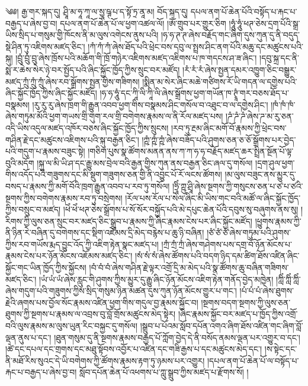 \setcounter{footnote}{0} 
༄༅། རྒྱ་གར་སྐད་དུ། ཤྲཱི་མ་ཧཱ་ཀཱ་ལ་སྱཱ་ཥྚ་པ་ད་སྟོ་ཏྲ་ནཱ་མ། བོད་སྐད་དུ། དཔལ་ནག་པོ་ཆེན་པོའི་བསྟོད་པ་རྐང་པ་བརྒྱད་པ་ཞེས་བྱ་བ། དཔལ་ནག་པོ་ཆེན་པོ་ལ་ཕྱག་འཚལ་ལོ། །ཨོཾ་གྲུབ་པར་གྱུར་ཅིག །ཧཱུཾ་ཧཱུཾ་ཕཊ་ཅེས་དྲག་པོའི་སྒྲ་ཡིས་སྲིད་པ་གསུམ་གྱི་ཁོངས་ནི་མ་ལུས་འགེངས་ནུས་པའི། །ཧ་ཧ་ཊ་ཊ་ཞེས་བརྗོད་གང་ཞིག་དུས་ཀུན་དུ་ནི་བདུད་སྡེ་ཤིན་ཏུ་འཇིགས་མཛད་ཅིང་། །ཀཾ་ཀཾ་ཀཾ་ཞེས་ཐོད་པའི་ཕྲེང་བས་དབུ་ལ་སྤྲས་ཤིང་ནག་པོའི་མཆུ་དང་མཚུངས་པའི་སྐུ། །བྲུཾ་བྲུཾ་བྲུ་ཞེས་ཁྲོས་པའི་མཆོག་གི་ཁྲོ་གཉེར་འཇིགས་མཛད་འཇིགས་པ་ཁ་གདངས་ཤ་ཟ་ཞིང་། །དབུ་སྐྲ་དང་ནི་སྨ་ར་ཆེས་སེར་ཉེ་བར་སྤྱོད་པའི་ཞིང་སྐྱོང་ཁྱོད་ཀྱིས་སྲུང་བར་མཛོད། །རཾ་རཾ་རཾ་ཞེས་སྤྱན་དམར་འཁྱུག་ཅིང་བསྒྱུར་མཛད་ཀྲུཾ་ཀྲུཾ་ཀྲུཾ་ཞེས་རབ་སྒྲོགས་སྤྱན་གྱིས་གཟིགས། །སྨིན་མ་སེར་ཞིང་མཆེ་གཙིགས་རོ་ཡི་གདན་ལ་དགྱེས་པའི་ཞིང་སྐྱོང་ཁྱོད་ཀྱིས་ཞིང་སྐྱོང་མཛོད། །ཧ་ཧ་ཧཱུཾ་དང་ཀཱི་ལི་ཀཱི་ལི་ཞེས་སྒྲོགས་ཕྱག་གཡོན་ཁ་ཊྭཱཾ་གར་བཅས་ཐོད་པ་བསྣམས། །རུ་རུ་རུ་ཞེས་ཁྲག་གི་རྒྱུན་འབབ་ཕྱག་གིས་བསྣམས་ཤིང་གསོལ་བ་འཐུང་བ་ལ་དགྱེས་ཤིང་། །ཁཾ་ཁཾ་ཁཾ་ཞེས་གཏུམ་མོའི་ཕྱག་གཡས་གྲི་གུག་རལ་གྲི་བགེགས་རྣམས་ལ་ནི་རོལ་མཛད་པས། །ཌཾ་ཌཾ་ཌཾ་ཞེས་ཌ་མ་རུ་ཅན་འདི་ཡིས་འདུལ་མཛད་འཁོར་བཅས་ཞིང་སྐྱོང་ཁྱོད་ཀྱིས་སྲུངས། །རབ་ཏུ་རྔམ་ཞིང་མགོ་བོ་རྣམས་ཀྱི་ཕྲེང་བས་གཤིན་རྗེ་དང་མཚུངས་འཇིགས་པའི་སྐུ་བརྒྱན་ཅིང་། །ཀྵཾ་ཀྵཾ་ཀྵཾ་ཞེས་བཟོད་པའི་ཤུགས་ཅན་ཅ་ཅོ་སྒྲོགས་པར་བྱེད་པའི་གདུག་པ་རྣམས་བཟུང་སྟེ། །གཅིག་པུས་སྣ་ཚོགས་མནན་ནས་ཀ་ཀ་ཧ་ཧ་བརྗོད་མཛད་ཆར་སྤྲིན་སྔོན་པོ་ལྟ་བུའི་མདོག །སྐུ་ལ་མི་ཡི་ཤ་དང་རྒྱུ་མས་བྲེལ་བའི་རྒྱན་གྱིས་ཀུན་ནས་བརྒྱན་ཅིང་ཞལ་དུ་གསོལ། །དྲག་ཤུལ་ཕྱག་གིས་འདོད་པའི་གཟུགས་དང་མི་སྡུག་གཟུགས་ཅན་གྱི་ནི་འབྱུང་པོ་རོ་ལངས་ཚོགས། །མ་ལུས་བཟུང་ནས་མྱུར་དུ་བསད་པ་རྣམས་ཀྱི་མགོ་བོའི་ཁྲག་རྒྱུན་འབབ་པ་རབ་ཏུ་གསོལ། །ཧྲཱིཾ་ཀྵུ་ཤྲཱི་ཞེས་སྔགས་ཀྱི་གསུངས་ཅན་པ་ཙ་པ་ཙའི་སྔགས་ཀྱིས་བགེགས་རྣམས་རབ་ཏུ་བསྲེགས། །རོལ་པས་རོལ་པ་སེལ་ཞིང་མི་ཡིས་གང་བའི་མཚོ་ལ་ཞིང་སྐྱོང་ཁྱོད་ཀྱིས་བསྲུང་བ་མཛད། །ཕེཾ་ཕེཾ་ཕཊ་ཅེས་སྒྲོགས་པ་སོ་སོར་བསྐྱོད་པའི་མེ་དཔུང་ཆེན་པོའི་དབུས་སུ་བཞུགས་ནས་སུ། །རིགས་ཀྱི་ལུས་ཅན་སྲུང་བར་མཛད་ཅིང་སྒྲུབ་པ་རྣམས་ཀྱི་ཞིང་རྣམས་ངེས་པར་ཞིང་སྐྱོང་མཛོད། །ཕྱུགས་རྣམས་ཀྱི་ནི་ཉིན་རེ་བཞིན་དུ་བགེགས་དང་སྡིག་འཇོམས་དྲི་མེད་བརྙེས་པ་ཆུ་ཉི་བཞིན། །ཙཾ་ཙཾ་ཙཾ་ཞེས་གཏུམ་པའི་ཤུགས་ཀྱིས་རབ་གཡོས་རྨད་བྱུང་འོད་ཀྱི་འཇིག་རྟེན་སྣང་མཛད་པ། །ཀྲཾ་ཀྲཾ་ཀྲཾ་ཞེས་གཤེགས་པས་དགྲ་བོ་ཉོན་མོངས་པ་རྣམས་ངེས་པར་ཉོན་མོངས་འཇོམས་མཛད་ཅིང་། །སཾ་སཾ་སཾ་ཞེས་ཚོགས་པའི་བདག་ཉིད་དམ་ཚིག་ཐོས་འཛིན་ཞིང་སྐྱོང་གང་ཡིན་ཁྱོད་ཀྱིས་སྐྱོངས། །བཾ་བཾ་བཾ་ཞེས་གཤིན་རྗེ་ལྟར་འགྲོ་དྲི་མ་མེད་པའི་སྣ་ཚོགས་ཆུ་བཞིན་གཟིགས་མཛད་ཅིང་། །ཡཾ་ཡཾ་ཡཾ་ཞེས་རླུང་གི་ཤུགས་ཀྱིས་མྱུར་དུ་རྒྱུ་ཞིང་ཉོན་མོངས་འཇིག་རྟེན་གནོད་བྱེད་མཁྱེན། །ཀླིཾ་ཀླིཾ་ཀླིཾ་ཞེས་གདུག་པའི་གཟུགས་ཀྱིས་སྲིད་གསུམ་ཉིན་མཚན་དུས་ཀུན་ཉོན་མོངས་གྱུར་པ་གང་། །པཾ་པཾ་པཾ་ཞེས་ཐུགས་རྗེའི་ཞགས་པས་བྱོལ་སོང་རྣམས་འཛིན་ཕྱག་གིས་གདུལ་བྱ་རྣམས་སྐྱོང་བ། །སྔགས་བདག་སྔགས་ཀྱི་ལུས་ཅན་ཐུགས་ཀྱི་སྔགས་པ་རྣམས་ལ་འབྲས་བུ་བློ་གྲོས་མཚུངས་མེད་སྟེར། །ཞིང་རྣམས་སྐྱོང་བར་མཛད་པ་ཁྱོད་ཀྱིས་འགྲོ་བའི་ལུས་རྣམས་མ་ལུས་ཡུན་རིང་བསྐྱང་དུ་གསོལ། །སྒྲུབ་པ་པོའམ་སློབ་དཔོན་འགའ་ཞིག་ཐོས་འཛིན་གང་ཞིག་བློ་ལྡན་ནུས་པ་དང་། །ཐུན་གསུམ་དུ་ནི་སྔགས་རྣམས་བརྒྱད་པོ་ཀློག་བྱེད་དེ་ནི་བསོད་ནམས་ལྡན་པར་འགྱུར་བ་དང་། །ཚེ་དང་དཔལ་དང་གྲགས་དང་མཐུ་སྟོབས་འབྱོར་པ་འཛིན་དང་གཟི་རྒྱས་པ་དང་མཚུངས་མེད་དང་། །ས་སྟེང་དང་ནི་མཐོ་རིས་སུའང་དེ་ཡི་བགེགས་ཀྱི་ཚོགས་རྣམས་རྟག་ཏུ་ཉམས་པར་འགྱུར། །དཔལ་ནག་པོ་ཆེན་པོ་ལ་བསྟོད་པ་རྐང་པ་བརྒྱད་པ་ཞེས་བྱ་བ། སློབ་དཔོན་ཆེན་པོ་འཕགས་པ་ཀླུ་སྒྲུབ་ཀྱིས་མཛད་པ་རྫོགས་སོ། །